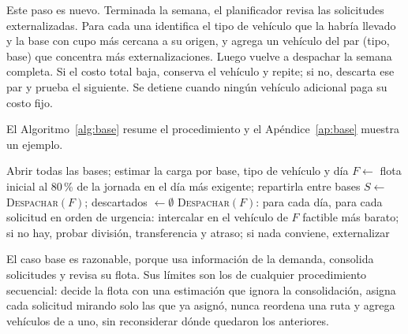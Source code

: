  Este paso es nuevo. Terminada la semana, el planificador revisa las solicitudes externalizadas. Para cada una identifica el tipo de vehículo que la habría llevado y la base con cupo más cercana a su origen, y agrega un vehículo del par (tipo, base) que concentra más externalizaciones. Luego vuelve a despachar la semana completa. Si el costo total baja, conserva el vehículo y repite; si no, descarta ese par y prueba el siguiente. Se detiene cuando ningún vehículo adicional paga su costo fijo.

El Algoritmo~\ref{alg:base} resume el procedimiento y el Apéndice~\ref{ap:base} muestra un ejemplo.

\begin{algorithm}[htbp]
\caption{Caso base: planificación por reglas.}\label{alg:base}
\small
{}
Abrir todas las bases; estimar la carga por base, tipo de vehículo y día\;
$F \leftarrow$ flota inicial al 80\,\% de la jornada en el día más exigente; repartirla entre bases\;
$S \leftarrow$ \textsc{Despachar}$(F)$; descartados $\leftarrow \emptyset$\;
\;
\BlankLine
\textsc{Despachar}$(F)$: para cada día, para cada solicitud en orden de urgencia: intercalar en el vehículo de $F$ factible más barato; si no hay, probar división, transferencia y atraso; si nada conviene, externalizar\;
\end{algorithm}

El caso base es razonable, porque usa información de la demanda, consolida solicitudes y revisa su flota. Sus límites son los de cualquier procedimiento secuencial: decide la flota con una estimación que ignora la consolidación, asigna cada solicitud mirando solo las que ya asignó, nunca reordena una ruta y agrega vehículos de a uno, sin reconsiderar dónde quedaron los anteriores.
